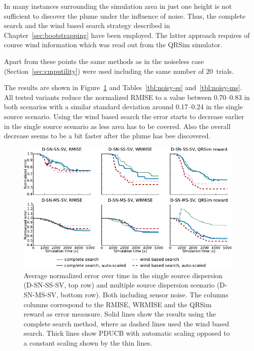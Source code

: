 In many instances surrounding the simulation area in just one height is not 
sufficient to discover the plume under the influence of noise. Thus, the 
complete search and the wind based search strategy described in 
Chapter~\ref{sec:bootstrapping} have been employed. The latter approach requires 
of course wind information which was read out from the QRSim simulator.

Apart from these points the same methods as in the noiseless case 
(Section~\ref{sec:cmputility}) were used including the same number of 20~trials.

The results are shown in Figure~\ref{fig:noisy-ss} and Tables~\ref{tbl:noisy-ss} 
and~\ref{tbl:noisy-ms}. All tested variants reduce the normalized RMISE to 
a value between \numrange{0.70}{0.83} in both scenarios with a similar standard 
deviation around \numrange{0.17}{0.24} in the single source scenario.  Using the 
wind based search the error starts to decrease earlier in the single source 
scenario as less area has to be covered.  Also the overall decrease seems to be 
a bit faster after the plume has bee discovered.

\begin{figure}
    \centering
    \includegraphics{plots/noisy-sv}
    \caption[Normalized error in sensor noise scenarios]{Average normalized 
        error over time in the single source dispersion (D-SN-SS-SV, top row) 
        and multiple source dispersion scenario (D-SN-MS-SV, bottom row). Both 
        including sensor noise.  The columns columns correspond to the RMISE, 
        WRMISE and the QRSim reward as error meausure. Solid lines show the 
        results using the complete search method, where as dashed lines used the 
        wind based search.  Thick lines show PDUCB with automatic scaling 
        opposed to a constant scaling shown by the thin 
        lines.}\label{fig:noisy-ss}
\end{figure}

